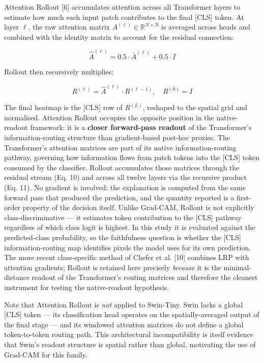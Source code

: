 \documentclass[11pt,a4paper]{article}
\begin{document}
Attention Rollout [6] accumulates attention across all Transformer layers to estimate how much each input patch contributes to the final [CLS] token. At layer $\ell$, the raw attention matrix $A^{(\ell)} \in \mathbb{R}^{N \times N}$ is averaged across heads and combined with the identity matrix to account for the residual connection:

\begin{equation}
\hat{A}^{(\ell)} = 0.5 \cdot \bar{A}^{(\ell)} + 0.5 \cdot I
\tag{10}
\end{equation}

Rollout then recursively multiplies:

\begin{equation}
R^{(\ell)} = \hat{A}^{(\ell)} \cdot R^{(\ell-1)}, \quad R^{(0)} = I
\tag{11}
\end{equation}

The final heatmap is the [CLS] row of $R^{(L)}$, reshaped to the spatial grid and normalised. Attention Rollout occupies the opposite position in the native-readout framework: it is a \textbf{closer forward-pass readout} of the Transformer's information-routing structure than gradient-based post-hoc proxies. The Transformer's attention matrices are part of its native information-routing pathway, governing how information flows from patch tokens into the [CLS] token consumed by the classifier. Rollout accumulates those matrices through the residual stream (Eq. 10) and across all twelve layers via the recursive product (Eq. 11). No gradient is involved: the explanation is computed from the same forward pass that produced the prediction, and the quantity reported is a first-order property of the decision itself. Unlike Grad-CAM, Rollout is not explicitly class-discriminative --- it
estimates token contribution to the [CLS] pathway regardless of which class logit is highest. In this study it is evaluated against the predicted-class probability, so the faithfulness question is whether the [CLS] information-routing map identifies pixels the model uses for its own prediction. The more recent class-specific method of Chefer et al. [10] combines LRP with attention gradients; Rollout is retained here precisely \emph{because} it is the minimal-distance readout of the Transformer's routing matrices and therefore the cleanest instrument for testing the native-readout hypothesis.

Note that Attention Rollout is \emph{not} applied to Swin-Tiny. Swin lacks a global [CLS] token --- its classification head operates on the spatially-averaged output of the final stage --- and its windowed attention matrices do not define a global token-to-token routing path. This architectural incompatibility is itself evidence that Swin's readout structure is spatial rather than global, motivating the use of Grad-CAM for this family.
\end{document}
